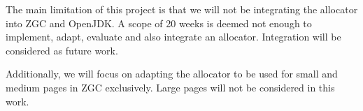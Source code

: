 
The main limitation of this project is that we will not be integrating the allocator into ZGC and OpenJDK. A scope of 20 weeks is deemed not enough to implement, adapt, evaluate and also integrate an allocator. Integration will be considered as future work.

Additionally, we will focus on adapting the allocator to be used for small and medium pages in ZGC exclusively. Large pages will not be considered in this work.


